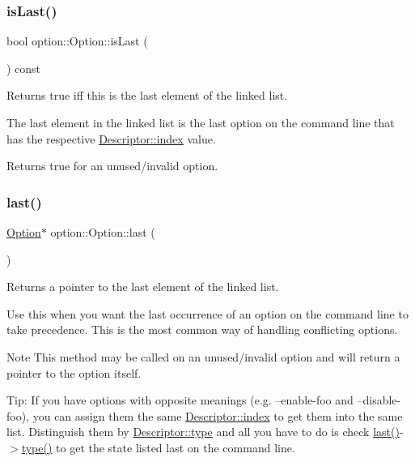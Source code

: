 \subsubsection{\texorpdfstring{is\+Last()}{isLast()}}
{\footnotesize\ttfamily bool option\+::\+Option\+::is\+Last (\begin{DoxyParamCaption}{ }\end{DoxyParamCaption}) const\hspace{0.3cm}{\ttfamily [inline]}}



Returns true iff this is the last element of the linked list. 

The last element in the linked list is the last option on the command line that has the respective \hyperlink{structoption_1_1Descriptor_a1fee8ac44f529c99ac2b1149b4c391b1}{Descriptor\+::index} value.

Returns true for an unused/invalid option. \mbox{\label{classoption_1_1Option_afe2aff68191e55b59c53fac3dbbcd7c3}} 
\subsubsection{\texorpdfstring{last()}{last()}}
{\footnotesize\ttfamily \hyperlink{classoption_1_1Option}{Option}$\ast$ option\+::\+Option\+::last (\begin{DoxyParamCaption}{ }\end{DoxyParamCaption})\hspace{0.3cm}{\ttfamily [inline]}}



Returns a pointer to the last element of the linked list. 

Use this when you want the last occurrence of an option on the command line to take precedence. This is the most common way of handling conflicting options.

\begin{DoxyNote}{Note}
This method may be called on an unused/invalid option and will return a pointer to the option itself.
\end{DoxyNote}
\begin{DoxyParagraph}{Tip\+:}
If you have options with opposite meanings (e.\+g. {\ttfamily --enable-\/foo} and {\ttfamily --disable-\/foo}), you can assign them the same \hyperlink{structoption_1_1Descriptor_a1fee8ac44f529c99ac2b1149b4c391b1}{Descriptor\+::index} to get them into the same list. Distinguish them by \hyperlink{structoption_1_1Descriptor_a1b220dabd8aad075fa441a80f9b9343c}{Descriptor\+::type} and all you have to do is check {\ttfamily  \hyperlink{classoption_1_1Option_afe2aff68191e55b59c53fac3dbbcd7c3}{last()}-\/$>$\hyperlink{classoption_1_1Option_a5268a69e1a91137186ab772574296da0}{type()} } to get the state listed last on the command line. 
\end{DoxyParagraph}
\mbox{\label{classoption_1_1Option_a59ae9aed505f4d410633bb36478a32be}} 
